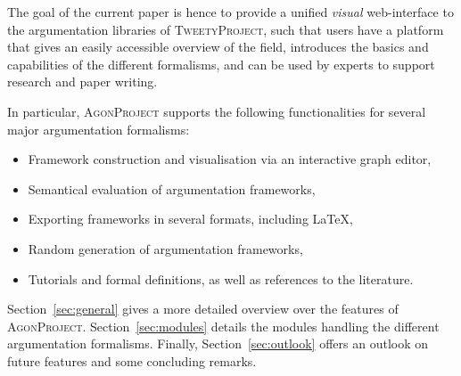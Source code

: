\documentclass[
]{ceurart}
\newcommand{\agon}{\textsc{AgonProject}\xspace}
\newcommand{\tweety}{\textsc{TweetyProject}\xspace}
\begin{document}
The goal of the current paper is hence to provide a unified \emph{visual} web-interface to the argumentation libraries of \tweety, such that users have a platform that gives an easily accessible overview of the field,
introduces the basics and capabilities of the different formalisms, and
can be used by experts to support research and paper writing.

In particular, \agon supports the following functionalities for several major argumentation formalisms:
\begin{itemize}
    \item Framework construction and visualisation via an interactive graph editor,
    \item Semantical evaluation of argumentation frameworks,
    \item Exporting frameworks in several formats, including \LaTeX,
    \item Random generation of argumentation frameworks,
    \item Tutorials and formal definitions, as well as references to the literature.
\end{itemize}

Section~\ref{sec:general} gives a more detailed overview over the features of \agon. Section~\ref{sec:modules} details the modules handling the different argumentation formalisms. Finally, Section~\ref{sec:outlook} offers an outlook on future features and some concluding remarks.

\end{document}
